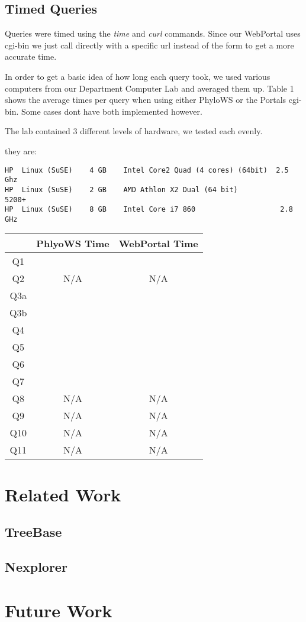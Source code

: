 \documentclass[10pt]{article}
\begin{document}
\subsection{Timed Queries}

Queries were timed using the \emph{time} and \emph{curl} commands.  Since our WebPortal uses cgi-bin we just call directly with a specific url instead of the form to get a more accurate time.

In order to get a basic idea of how long each query took, we used various computers from our Department Computer Lab and averaged them up.  Table 1 shows the average times per query when using either PhyloWS or the Portals cgi-bin.  Some cases dont have both implemented however.

The lab contained 3 different levels of hardware, we tested each evenly.

they are:\begin{verbatim}
HP 	Linux (SuSE) 	4 GB 	Intel Core2 Quad (4 cores) (64bit) 	2.5 Ghz
HP 	Linux (SuSE) 	2 GB 	AMD Athlon X2 Dual (64 bit) 	       5200+
HP 	Linux (SuSE) 	8 GB 	Intel Core i7 860 	                 2.8 GHz
\end{verbatim}

\begin{tabular}{|c|c|c|}
\hline
        & PhlyoWS Time & WebPortal Time \\ \hline
Q1   &         &      \\ \hline
Q2   & N/A  & N/A\\ \hline
Q3a   &         &\\ \hline
Q3b  &         &\\ \hline
Q4   &         &\\ \hline
Q5   &         &\\ \hline
Q6   &         &\\ \hline
Q7   &         &\\ \hline
Q8   & N/A & N/A\\ \hline
Q9   & N/A & N/A\\ \hline
Q10 & N/A & N/A\\ \hline
Q11 & N/A & N/A\\ \hline


\end{tabular}



\section{Related Work}

\subsection{TreeBase}

\subsection{Nexplorer}


\section{Future Work}
\end{document}
